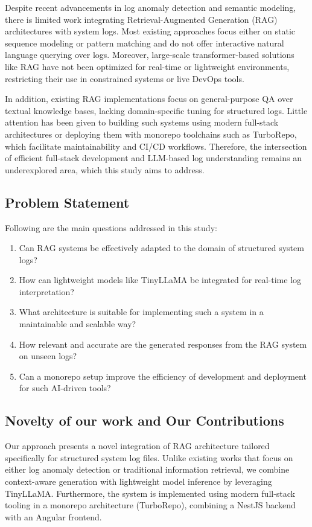 \documentclass[conference]{IEEEtran}
\begin{document}
Despite recent advancements in log anomaly detection and semantic modeling, there is limited work integrating Retrieval-Augmented Generation (RAG) architectures with system logs. Most existing approaches focus either on static sequence modeling or pattern matching and do not offer interactive natural language querying over logs. Moreover, large-scale transformer-based solutions like RAG have not been optimized for real-time or lightweight environments, restricting their use in constrained systems or live DevOps tools.

In addition, existing RAG implementations focus on general-purpose QA over textual knowledge bases, lacking domain-specific tuning for structured logs. Little attention has been given to building such systems using modern full-stack architectures or deploying them with monorepo toolchains such as TurboRepo, which facilitate maintainability and CI/CD workflows. Therefore, the intersection of efficient full-stack development and LLM-based log understanding remains an underexplored area, which this study aims to address.

\subsection{Problem Statement}

Following are the main questions addressed in this study:

\begin{enumerate}
    \item Can RAG systems be effectively adapted to the domain of structured system logs?
    \item How can lightweight models like TinyLLaMA be integrated for real-time log interpretation?
    \item What architecture is suitable for implementing such a system in a maintainable and scalable way?
    \item How relevant and accurate are the generated responses from the RAG system on unseen logs?
    \item Can a monorepo setup improve the efficiency of development and deployment for such AI-driven tools?
\end{enumerate}

\subsection{Novelty of our work and Our Contributions}

Our approach presents a novel integration of RAG architecture tailored specifically for structured system log files. Unlike existing works that focus on either log anomaly detection or traditional information retrieval, we combine context-aware generation with lightweight model inference by leveraging TinyLLaMA. Furthermore, the system is implemented using modern full-stack tooling in a monorepo architecture (TurboRepo), combining a NestJS backend with an Angular frontend.
\end{document}
